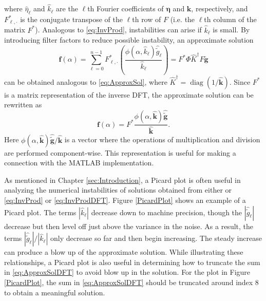\documentclass[12pt]{book}
\newcommand{\gnoise}{\widetilde{g}}	%
\newcommand{\gnoiseVec}{\widetilde{\mathbf{g}}}	%
\newcommand{\kVec}{\mathbf{k}}	%
\newcommand{\kMat}{K}	%
\newcommand{\fVec}{\mathbf{f}}	%
\newcommand{\ctrans}{*}	%
\DeclareMathOperator{\diag}{diag}	%
\newcommand{\regparam}{\alpha}
\newcommand{\filt}{\phi}
\newcommand{\noise}{\eta}	%
\newcommand{\noiseVec}{\bm{\noise}}	%
\begin{document}
where $\widehat{\noise}_\ell$ and $\widehat{k}_\ell$ are the $\ell$th Fourier coefficients of $\noiseVec$ and $\kVec$, respectively, and $F^\ctrans_{\ell,\cdot}$ is the conjugate transpose of the $\ell$th row of $F$ (i.e. the $\ell$th column of the matrix $F^\ctrans$). Analogous to \eqref{eq:InvProd}, instabilities can arise if $\widehat{k}_\ell$ is small. By introducing filter factors to reduce possible instability, an approximate solution
\begin{equation}
\fVec(\regparam) = \sum_{\ell = 0}^{n-1} F^\ctrans_{\ell,\cdot}\left(\frac{\filt(\regparam,\widehat{k}_\ell)\widehat{\gnoise}_\ell}{\widehat{k}_\ell}\right) = F^\ctrans\Phi\widehat{\kMat}^\dagger F\gnoiseVec
\label{eq:ApproxSolDFT}
\end{equation}
can be obtained analogous to \eqref{eq:ApproxSol}, where $\widehat{\kMat}^\dagger = \diag(1/\widehat{\kVec})$.
Since $F^\ctrans$ is a matrix representation of the inverse DFT, the approximate solution can be rewritten as
\[\fVec(\regparam) = F^\ctrans \frac{\filt(\regparam,\widehat{\kVec})\widehat{\gnoiseVec}}{\widehat{\kVec}}.\]
Here $\filt(\regparam,\widehat{\kVec})\widehat{\gnoiseVec}/{\widehat{\kVec}}$ is a vector where the operations of multiplication and division are performed component-wise. This representation is useful for making a connection with the MATLAB implementation. \par
As mentioned in Chapter \ref{sec:Introduction}, a Picard plot is often useful in analyzing the numerical instabilities of solutions obtained from either or \eqref{eq:InvProd} or \eqref{eq:InvProdDFT}. Figure \ref{PicardPlot} shows an example of a Picard plot. The terms $|\widehat{k}_\ell|$ decrease down to machine precision, though the $|\widehat{\gnoise}_\ell|$ decrease but then level off just above the variance in the noise. As a result, the terms $|\widehat{\gnoise}_\ell|/|\widehat{k}_\ell|$ only decrease so far and then begin increasing. The steady increase can produce a blow up of the approximate solution. While illustrating these relationships, a Picard plot is also useful in determining how to truncate the sum in \eqref{eq:ApproxSolDFT} to avoid blow up in the solution. For the plot in Figure \ref{PicardPlot}, the sum in \eqref{eq:ApproxSolDFT} should be truncated around index 8 to obtain a meaningful solution. \par 
\end{document}
